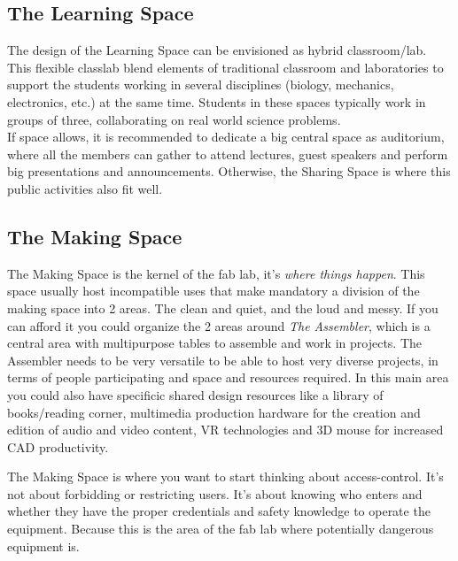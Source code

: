 \documentclass[a4paper,12pt,titlepage]{article}
\begin{document}
\subsection{The Learning Space}
The design of the
Learning Space can be
envisioned as hybrid
classroom/lab.
This flexible
classlab blend
elements of traditional
classroom and
laboratories to
support the students working
in several disciplines
(biology, mechanics,
electronics, etc.) at the same time. Students in these spaces typically work in
groups of three, collaborating on real world science problems.\\ 

If space allows, it is recommended to dedicate a big central space as auditorium, where all the members can gather to attend
lectures, guest speakers and perform big presentations and announcements. Otherwise, the Sharing Space is where this public activities also fit well.



\subsection{The Making Space}
The Making Space is the kernel of the fab lab, it's \textit{where things happen}. This
space  usually host incompatible uses that make mandatory a division of the making space into 2 areas. The clean and quiet, and the loud and messy. If you can afford it you could organize the 2 areas around \textit{The
Assembler}, which is a central area with multipurpose tables to assemble and work in projects.
The Assembler needs to be very versatile to be able to host very diverse projects, in terms of
people participating and space and resources required. In this main area you could also have specificic shared design resources like a library of books/reading corner, multimedia production hardware for the creation and edition of audio and video content, VR technologies and 3D mouse for increased CAD productivity.\\

\begin{figure}[h]
\centering
{}
\end{figure}
The Making Space is where you want to start thinking about access-control. It's not about forbidding or restricting users. It's about  knowing who enters and whether they have the proper credentials and safety knowledge to operate the equipment. Because this is the area of the fab lab where potentially dangerous equipment is.
\end{document}
